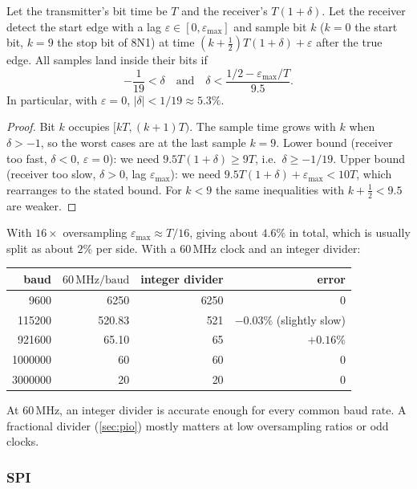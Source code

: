 \begin{proposition}\label{prop:baud}
Let the transmitter's bit time be $T$ and the receiver's $T(1+\delta)$. Let
the receiver detect the start edge with a lag $\varepsilon\in[0,\varepsilon_{\max}]$
and sample bit $k$ ($k=0$ the start bit, $k=9$ the stop bit of 8N1) at time
$(k+\tfrac12)T(1+\delta)+\varepsilon$ after the true edge. All samples land
inside their bits if
\[
  -\frac{1}{19} < \delta \quad\text{and}\quad
  \delta < \frac{1/2 - \varepsilon_{\max}/T}{9.5}.
\]
In particular, with $\varepsilon=0$, $|\delta| < 1/19 \approx 5.3\%$.
\end{proposition}
\begin{proof}
Bit $k$ occupies $[kT,(k+1)T)$. The sample time grows with $k$ when
$\delta>-1$, so the worst cases are at the last sample $k=9$. Lower bound
(receiver too fast, $\delta<0$, $\varepsilon=0$): we need
$9.5T(1+\delta) \ge 9T$, i.e.\ $\delta \ge -1/19$. Upper bound (receiver too
slow, $\delta>0$, lag $\varepsilon_{\max}$): we need
$9.5T(1+\delta)+\varepsilon_{\max} < 10T$, which rearranges to the stated
bound. For $k<9$ the same inequalities with $k+\tfrac12<9.5$ are weaker.
\end{proof}
With $16\times$ oversampling $\varepsilon_{\max}\approx T/16$, giving about
$4.6\%$ in total, which is usually split as about $2\%$ per side. With a
60\,MHz clock and an integer divider:
\begin{center}
\begin{tabular}{|r|r|r|r|}
\hline
baud & $60\,\mathrm{MHz}/\text{baud}$ & integer divider & error \\ \hline
9600 & 6250 & 6250 & 0 \\
115200 & 520.83 & 521 & $-0.03\%$ (slightly slow) \\
921600 & 65.10 & 65 & $+0.16\%$ \\
1000000 & 60 & 60 & 0 \\
3000000 & 20 & 20 & 0 \\ \hline
\end{tabular}
\end{center}
At 60\,MHz, an integer divider is accurate enough for every common baud
rate. A fractional divider (\cref{sec:pio}) mostly matters at low
oversampling ratios or odd clocks.

\subsubsection{SPI}

